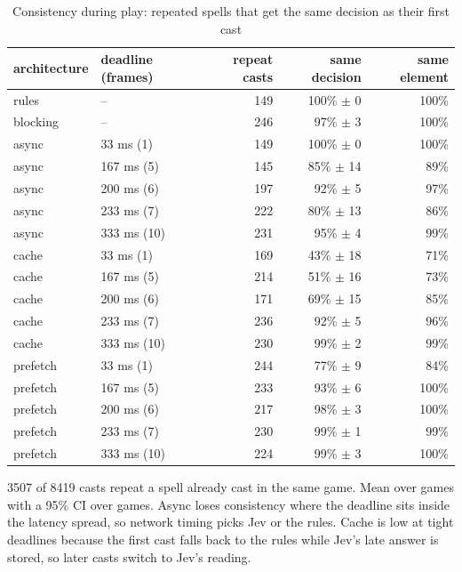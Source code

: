 \begin{table}[ht]
\centering
\small
\caption{Consistency during play: repeated spells that get the same decision as their first cast}
\label{tab:sweep-consistency}
\begin{tabular}{llrrr}
\toprule
architecture & deadline (frames) & repeat casts & same decision & same element \\
\midrule
rules & -- & 149 & 100\% $\pm$ 0 & 100\% \\
blocking & -- & 246 & 97\% $\pm$ 3 & 100\% \\
async & 33 ms (1) & 149 & 100\% $\pm$ 0 & 100\% \\
async & 167 ms (5) & 145 & 85\% $\pm$ 14 & 89\% \\
async & 200 ms (6) & 197 & 92\% $\pm$ 5 & 97\% \\
async & 233 ms (7) & 222 & 80\% $\pm$ 13 & 86\% \\
async & 333 ms (10) & 231 & 95\% $\pm$ 4 & 99\% \\
cache & 33 ms (1) & 169 & 43\% $\pm$ 18 & 71\% \\
cache & 167 ms (5) & 214 & 51\% $\pm$ 16 & 73\% \\
cache & 200 ms (6) & 171 & 69\% $\pm$ 15 & 85\% \\
cache & 233 ms (7) & 236 & 92\% $\pm$ 5 & 96\% \\
cache & 333 ms (10) & 230 & 99\% $\pm$ 2 & 99\% \\
prefetch & 33 ms (1) & 244 & 77\% $\pm$ 9 & 84\% \\
prefetch & 167 ms (5) & 233 & 93\% $\pm$ 6 & 100\% \\
prefetch & 200 ms (6) & 217 & 98\% $\pm$ 3 & 100\% \\
prefetch & 233 ms (7) & 230 & 99\% $\pm$ 1 & 99\% \\
prefetch & 333 ms (10) & 224 & 99\% $\pm$ 3 & 100\% \\
\bottomrule
\end{tabular}
\par\smallskip\footnotesize 3507 of 8419 casts repeat a spell already cast in the same game. Mean over games with a 95\% CI over games. Async loses consistency where the deadline sits inside the latency spread, so network timing picks Jev or the rules. Cache is low at tight deadlines because the first cast falls back to the rules while Jev's late answer is stored, so later casts switch to Jev's reading.
\end{table}
